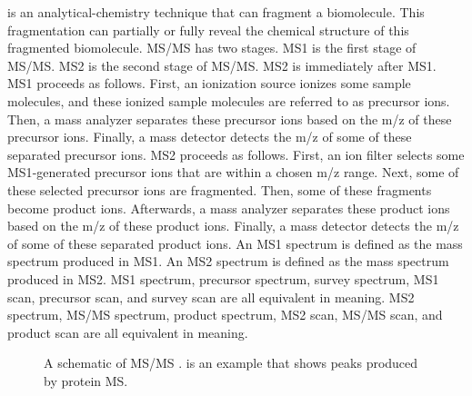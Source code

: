  is an analytical-chemistry technique that can fragment a biomolecule.
This fragmentation can partially or fully reveal the chemical structure of this fragmented biomolecule.
\Gls{MS/MS} has two stages.
\Gls{MS1} is the first  stage of \gls{MS/MS}.
\Gls{MS2} is the second stage of \gls{MS/MS}.
\Gls{MS2} is immediately after \gls{MS1}.
\Gls{MS1} proceeds as follows.
First, an ionization source ionizes some sample molecules, and these ionized sample molecules are referred to as precursor ions.
Then, a mass analyzer separates these precursor ions based on the \gls{m/z} of these precursor ions. 
Finally, a mass detector detects the \gls{m/z} of some of these separated precursor ions.
\Gls{MS2} proceeds as follows. 
First, an ion filter selects some \gls{MS1}-generated precursor ions that are within a chosen \gls{m/z} range. %
Next, some of these selected precursor ions are fragmented. 
Then, some of these fragments become product ions. %
Afterwards, a mass analyzer separates these product ions based on the \gls{m/z} of these product ions.
Finally, a mass detector detects the \gls{m/z} of some of these separated product ions.
An \gls{MS1} spectrum is defined as the mass spectrum produced in \gls{MS1}.
An \gls{MS2} spectrum is defined as the mass spectrum produced in \gls{MS2}.
\Gls{MS1} spectrum, precursor spectrum, survey spectrum, \gls{MS1} scan, precursor scan, and survey scan are all equivalent in meaning.
\gls{MS2} spectrum, \gls{MS/MS} spectrum, product spectrum, \gls{MS2} scan, \gls{MS/MS} scan, and product scan are all equivalent in meaning.
\begin{figure}
\caption[
	A schematic of \gls{MS/MS} \cite{eidhammer2008computational}.]{
	A schematic of \gls{MS/MS} \cite{eidhammer2008computational}.
	 is an example that shows peaks produced by protein \gls{MS}.
}
\label{schematics_MSMS_instrument}
\end{figure}


